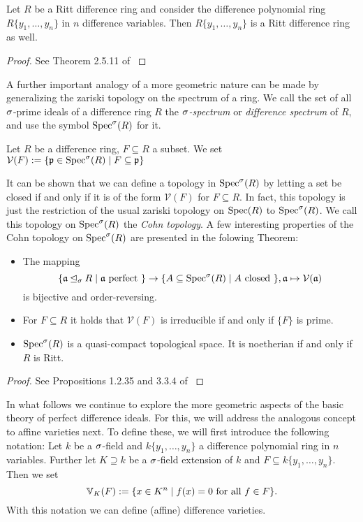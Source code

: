 \begin{theorem}
Let $R$ be a Ritt difference ring and consider the difference polynomial ring $R\{y_1, \ldots, y_n\}$ in $n$ difference variables. Then $R\{y_1, \ldots, y_n\}$ is a Ritt difference ring as well.
\begin{proof} See Theorem 2.5.11 of \cite{levin} \end{proof}
\end{theorem}

A further important analogy of a more geometric nature can be made by generalizing the zariski topology on the spectrum of a ring. 
We call the set of all $\sigma$-prime ideals of a difference ring $R$ the \emph{$\sigma$-spectrum} or \emph{difference spectrum}  of $R$, and use the symbol $\operatorname{Spec}^\sigma(R)$ for it.

\begin{defn}
Let $R$ be a difference ring, $F \subseteq R$ a subset. We set $\mathcal{V}(F) := \{ \mathfrak{p} \in \operatorname{Spec}^\sigma(R) \mid F \subseteq \mathfrak{p} \}$
\end{defn}

It can be shown that we can define a topology in $\operatorname{Spec}^\sigma(R)$ by letting a set be closed if and only if it is of the form $\mathcal{V}(F)$ for $F \subseteq R$. 
In fact, this topology is just the restriction of the usual zariski topology on $\operatorname{Spec}(R)$ to $\operatorname{Spec}^\sigma(R)$.
We call this topology on $\operatorname{Spec}^\sigma(R)$ the \emph{Cohn topology}. A few interesting properties of the Cohn topology on $\operatorname{Spec}^\sigma(R)$ are presented in the folowing Theorem:

\begin{prop}
\begin{itemize}
Let $R$ be a difference ring. Then: 
\item The mapping $$\{ \mathfrak{a} \unlhd_{\sigma} R \mid \mathfrak{a}\text{ perfect }\} \rightarrow \{ A \subseteq \operatorname{Spec}^\sigma(R) \mid A \text{ closed }\}, \mathfrak{a} \mapsto \mathcal{V}(\mathfrak{a})$$
 is bijective and order-reversing.
\item For $F \subseteq R$ it holds that $\mathcal{V}(F)$ is irreducible if and only if $\{F\}$ is prime.
\item $\operatorname{Spec}^\sigma(R)$ is a quasi-compact topological space. It is noetherian if and only if $R$ is Ritt.
\end{itemize}
\begin{proof} See Propositions 1.2.35 and 3.3.4 of \cite{wibmer} \end{proof}
\end{prop}

In what follows we continue to explore the more geometric aspects of the basic theory of perfect difference ideals.
For this, we will address the analogous concept to affine varieties next. To define these, we will first introduce the following notation:
Let $k$ be a $\sigma$-field and $k\{y_1,\ldots,y_n\}$ a difference polynomial ring in $n$ variables. Further let $K \supseteq k$ be a $\sigma$-field extension of $k$ and $F \subseteq k\{y_1,\ldots,y_n\}$.
Then we set $$\mathbb{V}_K(F) := \{ x \in K^n \mid f(x) = 0 \text{ for all } f \in F \}.$$
With this notation we can define (affine) difference varieties.

